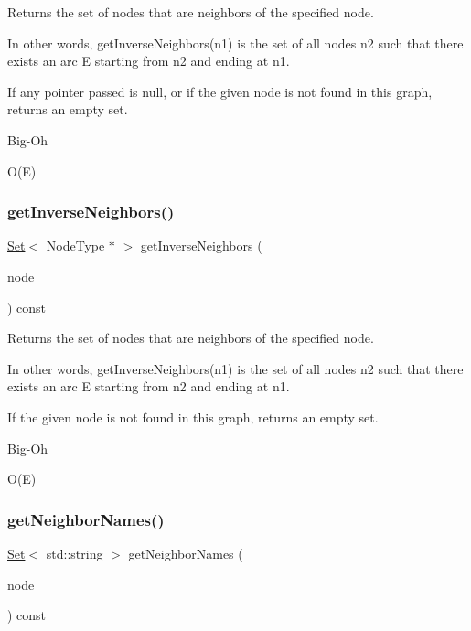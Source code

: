 Returns the set of nodes that are neighbors of the specified node. 

In other words, get\+Inverse\+Neighbors(n1) is the set of all nodes n2 such that there exists an arc E starting from n2 and ending at n1.

If any pointer passed is null, or if the given node is not found in this graph, returns an empty set. \begin{DoxyRefDesc}{Big-\/\+Oh}
\item[\mbox{\hyperlink{BigOh__BigOh000069}{Big-\/\+Oh}}]O(\+E) \end{DoxyRefDesc}
\mbox{\label{classGraph_a5294846b9cdd19394808e3736ec67004}} 
\subsubsection{\texorpdfstring{get\+Inverse\+Neighbors()}{getInverseNeighbors()}\hspace{0.1cm}{\footnotesize\ttfamily [2/2]}}
{\footnotesize\ttfamily \mbox{\hyperlink{classstanfordcpplib_1_1collections_1_1GenericSet}{Set}}$<$ Node\+Type $\ast$ $>$ get\+Inverse\+Neighbors (\begin{DoxyParamCaption}\item[{const std\+::string \&}]{node }\end{DoxyParamCaption}) const}



Returns the set of nodes that are neighbors of the specified node. 

In other words, get\+Inverse\+Neighbors(n1) is the set of all nodes n2 such that there exists an arc E starting from n2 and ending at n1.

If the given node is not found in this graph, returns an empty set. \begin{DoxyRefDesc}{Big-\/\+Oh}
\item[\mbox{\hyperlink{BigOh__BigOh000070}{Big-\/\+Oh}}]O(\+E) \end{DoxyRefDesc}
\mbox{\label{classGraph_ae9b5cbd2bcb3918c4c64b1eb71c1a3a8}} 
\subsubsection{\texorpdfstring{get\+Neighbor\+Names()}{getNeighborNames()}\hspace{0.1cm}{\footnotesize\ttfamily [1/2]}}
{\footnotesize\ttfamily \mbox{\hyperlink{classstanfordcpplib_1_1collections_1_1GenericSet}{Set}}$<$ std\+::string $>$ get\+Neighbor\+Names (\begin{DoxyParamCaption}\item[{Node\+Type $\ast$}]{node }\end{DoxyParamCaption}) const}



